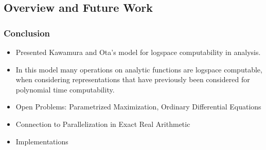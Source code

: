 \documentclass[xcolor=pdftex,dvipsnames,table]{beamer}
\begin{document}
\subsection*{Overview and Future Work}
\begin{frame}
  \frametitle{Conclusion}
  \begin{itemize}
    \item Presented Kawamura and Ota's model for logspace computability in analysis.
    \item In this model many operations on analytic functions are logspace computable, when considering representations that have previously been considered for polynomial time computability.
    \item Open Problems: Parametrized Maximization, Ordinary Differential Equations
     \item Connection to Parallelization in Exact Real Arithmetic
     \item Implementations
  \end{itemize}
\end{frame}
\end{document}
